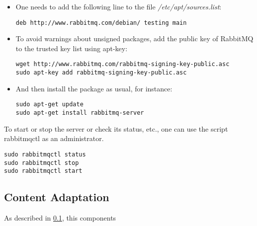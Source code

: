 \begin{itemize}

\item One needs to add the following line to the file \textit{/etc/apt/sources.list}:

\begin{code}
\begin{verbatim}
deb http://www.rabbitmq.com/debian/ testing main
\end{verbatim}
\end{code}

\item To avoid warnings about unsigned packages, add the public key of RabbitMQ to the trusted key list using apt-key:

\begin{code}
\begin{verbatim}
wget http://www.rabbitmq.com/rabbitmq-signing-key-public.asc
sudo apt-key add rabbitmq-signing-key-public.asc
\end{verbatim}
\end{code}

\item And then install the package as usual, for instance:

\begin{code}
\begin{verbatim}
sudo apt-get update
sudo apt-get install rabbitmq-server
\end{verbatim}
\end{code}

\end{itemize} 

To start or stop the server or check its status, etc., one can use the script rabbitmqctl as an administrator. 
\begin{code}
\begin{verbatim}
sudo rabbitmqctl status
sudo rabbitmqctl stop
sudo rabbitmqctl start
\end{verbatim}
\end{code}

\subsection{Content Adaptation\label{sec:eval_te_mb}}
As described in \ref{}, this components 

